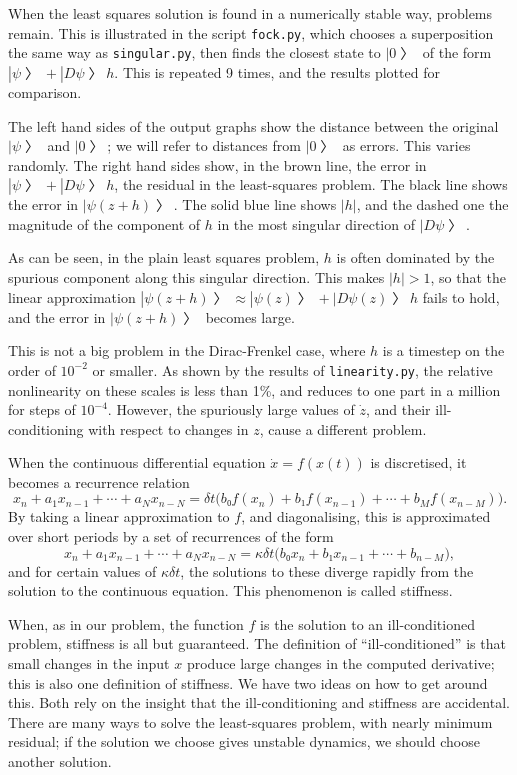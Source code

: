 When the least squares solution is found in a numerically stable way, problems remain.  This is illustrated in the script {\tt fock.py}, which chooses a superposition the same way as {\tt singular.py}, then finds the closest state to $|0〉$ of the form $|ψ〉+|Dψ〉h$.  This is repeated 9 times, and the results plotted for comparison.

The left hand sides of the output graphs show the distance between the original $|ψ〉$ and $|0〉$; we will refer to distances from $|0〉$ as errors.  This varies randomly.  The right hand sides show, in the brown line, the error in $|ψ〉+|Dψ〉h$, the residual in the least-squares problem.  The black line shows the error in $|ψ(z+h)〉$.  The solid blue line shows $|h|$, and the dashed one the magnitude of the component of $h$ in the most singular direction of $|Dψ〉$.

As can be seen, in the plain least squares problem, $h$ is often dominated by the spurious component along this singular direction.  This makes $|h|>1$, so that the linear approximation $|ψ(z+h)〉≈|ψ(z)〉+|Dψ(z)〉h$ fails to hold, and the error in $|ψ(z+h)〉$ becomes large.

This is not a big problem in the Dirac-Frenkel case, where $h$ is a timestep on the order of $10^{-2}$ or smaller.  As shown by the results of {\tt linearity.py}, the relative nonlinearity on these scales is less than 1\%, and reduces to one part in a million for steps of $10^{-4}$.  However, the spuriously large values of $\dot z$, and their ill-conditioning with respect to changes in $z$, cause a different problem.

When the continuous differential equation $\dot x=f(x(t))$ is discretised, it becomes a recurrence relation $$x_n+a_1x_{n-1}+⋯+a_Nx_{n-N} = δt\bigl(b₀f(x_n)+b₁f(x_{n-1})+⋯+b_Mf(x_{n-M})\bigr).$$  By taking a linear approximation to $f$, and diagonalising, this is approximated over short periods by a set of recurrences of the form $$x_n+a_1x_{n-1}+⋯+a_Nx_{n-N} = κδt\bigl(b₀x_n+b₁x_{n-1}+⋯+b_{n-M}\bigr),$$ and for certain values of $κδt$, the solutions to these diverge rapidly from the solution to the continuous equation.  This phenomenon is called stiffness.

When, as in our problem, the function $f$ is the solution to an ill-conditioned problem, stiffness is all but guaranteed.  The definition of “ill-conditioned” is that small changes in the input $x$ produce large changes in the computed derivative; this is also one definition of stiffness.  We have two ideas on how to get around this.  Both rely on the insight that the ill-conditioning and stiffness are accidental.  There are many ways to solve the least-squares problem, with nearly minimum residual; if the solution we choose gives unstable dynamics, we should choose another solution.

